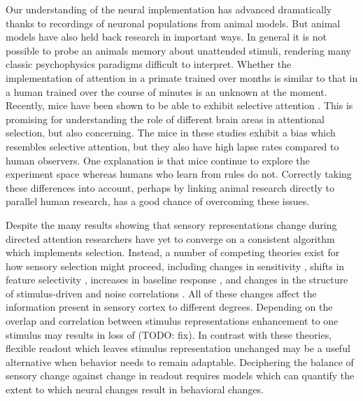 Our understanding of the neural implementation has advanced dramatically thanks to recordings of neuronal populations from animal models. But animal models have also held back research in important ways. In general it is not possible to probe an animals memory about unattended stimuli, rendering many classic psychophysics paradigms difficult to interpret. Whether the implementation of attention in a primate trained over months is similar to that in a human trained over the course of minutes is an unknown at the moment. Recently, mice have been shown to be able to exhibit selective attention \citep{McBride2019-py,Wang2018-ge}. This is promising for understanding the role of different brain areas in attentional selection, but also concerning. The mice in these studies exhibit a bias which resembles selective attention, but they also have high lapse rates compared to human observers. One explanation is that mice continue to explore the experiment space \citep{Pisupati2019-cl} whereas humans who learn from rules do not. Correctly taking these differences into account, perhaps by linking animal research directly to parallel human research, has a good chance of overcoming these issues. 

Despite the many results showing that sensory representations change during directed attention researchers have yet to converge on a consistent algorithm which implements selection. Instead, a number of competing theories exist for how sensory selection might proceed, including changes in sensitivity \citep{Reynolds2000-mg,Serences2007-le,Snyder2018-yr,Treue1999-mp}, shifts in feature selectivity \citep{Cukur2013-gx,David2008-zx,Kastner1998-bi,Klein2014-oe,Spitzer1988-ib,Womelsdorf2006-np,Womelsdorf2008-bm}, increases in baseline response \citep{Buracas2007-pe,Chen2012-fu,Fang2008-ny,Kastner1999-qu,Li2008-fe}, and changes in the structure of stimulus-driven and noise correlations \citep{Cohen2009-bt,Mitchell2009-do, Ruff2016-dv,Verhoef2017-cm}. All of these changes affect the information present in sensory cortex to different degrees. Depending on the overlap and correlation between stimulus representations enhancement to one stimulus may results in loss of (TODO: fix). In contrast with these theories, flexible readout which leaves stimulus representation unchanged \citep{Birman_undated-vk} may be a useful alternative when behavior needs to remain adaptable. Deciphering the balance of sensory change against change in readout requires models which can quantify the extent to which neural changes result in behavioral changes. 

